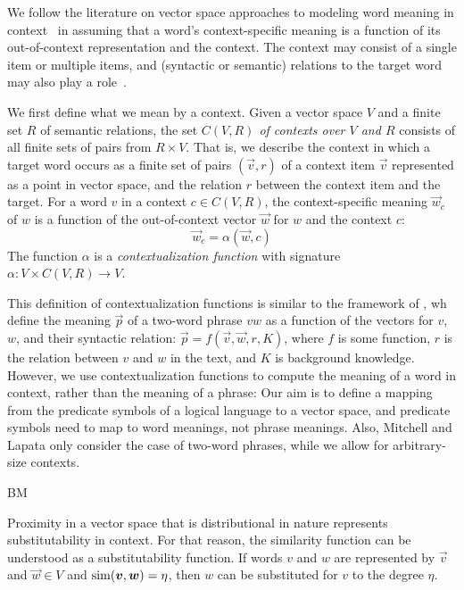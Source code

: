 We follow the literature on vector space approaches to modeling word
meaning in
context~\citep{erk:emnlp08,ThaterFuerstenauPinkal:10,ReisingerMooney:10,dinu-lapata:2010:EMNLP,vandecruys:emnlp2011}
in assuming that a word's context-specific meaning is a function of its
out-of-context representation and the context. The context may consist
of a single item or multiple items, and (syntactic or semantic) relations to the
target word may also play a
role~\citep{erk:emnlp08,ThaterFuerstenauPinkal:10,vandecruys:emnlp2011}. 

We
first define what we mean by a context. Given a vector space $V$ and a
finite set $R$ of semantic relations, the set
\textit{$C(V, R)$ of contexts over $V$ and $R$} consists of all finite sets of
pairs from $R \times V$.  That is, we describe the context in which a
target word occurs as a finite set of pairs $(\vec v, r)$ of a context
item $\vec v$ represented as a point in vector space, and the relation $r$
between the context item and the target. 
For a word $v$ in a context $c
\in C(V, R)$, the context-specific meaning $\vec w_c$ of $w$ is a
function of the out-of-context vector $\vec w$ for $w$ and the context
$c$:
\[\vec w_c = \alpha(\vec w, c)\]
The function $\alpha$ is a \emph{contextualization function} with
signature $\alpha: V \times C(V, R) \to V$. 

This definition of contextualization functions is similar to the
framework of \citet{MitchellLapata:08}, wh define the meaning $\vec p$
of a two-word phrase $vw$ as a function of the vectors for $v$, $w$, and their
syntactic relation: $\vec p = f(\vec v, \vec w, r, K)$,  where $f$ is some function, $r$ is the
relation between $v$ and $w$ in the text, and $K$ is background
knowledge. However, we use contextualization functions to compute the meaning of a word in
context, rather than the meaning of a phrase: Our aim is to define a
mapping from the predicate symbols of a logical language to a vector
space, and predicate symbols need to map to word meanings, not phrase
meanings. Also, Mitchell and Lapata only consider the case of two-word
phrases, while we allow for arbitrary-size contexts. 

BM

Proximity in a
vector space that is distributional in nature represents
substitutability in context. For that reason, the similarity function can be understood as a
substitutability function.  If words $v$ and $w$ are represented by $\vec
v$ and $\vec w \in V$ and $\simfunc(\vec v, \vec w) = \eta$, then $w$ can be
substituted for $v$ to the degree $\eta$.

